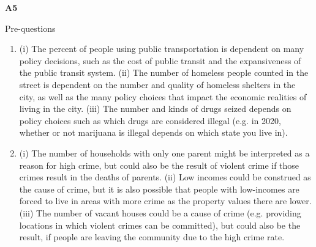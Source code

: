 \documentclass{article}
\begin{document}
\newpage

\textbf{A5}

Pre-questions
\begin{enumerate}
        \item (i) The percent of people using public transportation is dependent on many policy decisions, such as the cost of public transit and the expansiveness of the public transit system.
        (ii) The number of homeless people counted in the street is dependent on the number and quality of homeless shelters in the city, as well as the many policy choices that impact the economic realities of living in the city.
        (iii) The number and kinds of drugs seized depends on policy choices such as which drugs are considered illegal (e.g. in 2020, whether or not marijuana is illegal depends on which state you live in).

        \item (i) The number of households with only one parent might be interpreted as a reason for high crime, but could also be the result of violent crime if those crimes result in the deaths of parents.
        (ii) Low incomes could be construed as the cause of crime, but it is also possible that people with low-incomes are forced to live in areas with more crime as the property values there are lower.
        (iii) The number of vacant houses could be a cause of crime (e.g. providing locations in which violent crimes can be committed), but could also be the result, if people are leaving the community due to the high crime rate.
\end{enumerate}
\end{document}
